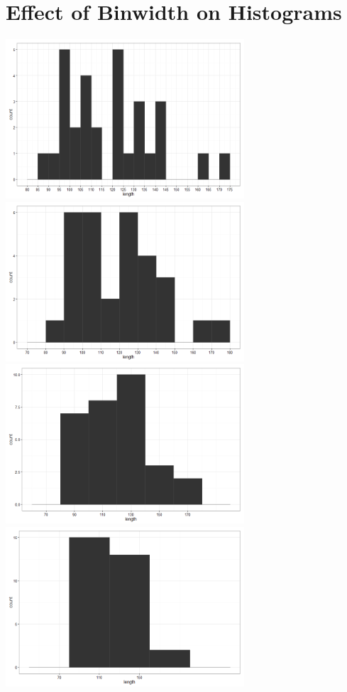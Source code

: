 \documentclass[12pt]{article}
\begin{document}
\section{Effect of Binwidth on
Histograms}\label{effect-of-binwidth-on-histograms}

\includegraphics[width=3.5in]{figure/histbin-1.png}
\includegraphics[width=3.5in]{figure/histbin-2.png}\\
\includegraphics[width=3.5in]{figure/histbin-3.png}
\includegraphics[width=3.5in]{figure/histbin-4.png}
\end{document}
